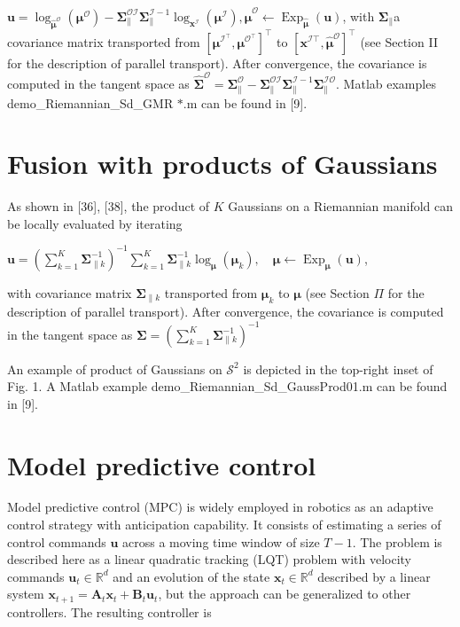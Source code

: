 \documentclass[10pt]{article}
\begin{document}
$\boldsymbol{u}=\log _{\hat{\boldsymbol{\mu}}^{\mathcal{O}}}\left(\boldsymbol{\mu}^{\mathcal{O}}\right)-\boldsymbol{\Sigma}_{\|}^{\mathcal{O I}} \boldsymbol{\Sigma}_{\|}^{\mathcal{I}-1} \log _{\boldsymbol{x}^{\mathcal{I}}}\left(\boldsymbol{\mu}^{\mathcal{I}}\right), \hat{\boldsymbol{\mu}}^{\mathcal{O}} \leftarrow \operatorname{Exp}_{\hat{\boldsymbol{\mu}}}(\boldsymbol{u})$, with $\boldsymbol{\Sigma}_{\|}$a covariance matrix transported from $\left[\boldsymbol{\mu}^{\mathcal{I}^{\top}}, \boldsymbol{\mu}^{\mathcal{O}^{\top}}\right]^{\top}$ to $\left[\boldsymbol{x}^{\mathcal{I} \top}, \hat{\boldsymbol{\mu}}^{\mathcal{O}}\right]^{\top}$ (see Section II for the description of parallel transport). After convergence, the covariance is computed in the tangent space as $\hat{\boldsymbol{\Sigma}}^{\mathcal{O}}=\boldsymbol{\Sigma}_{\|}^{\mathcal{O}}-\boldsymbol{\Sigma}_{\|}^{\mathcal{O I}} \boldsymbol{\Sigma}_{\|}^{\mathcal{I}-1} \boldsymbol{\Sigma}_{\|}^{\mathcal{I O}}$. Matlab examples demo\_Riemannian\_Sd\_GMR $* . \mathrm{m}$ can be found in [9].

\section{Fusion with products of Gaussians}
As shown in [36], [38], the product of $K$ Gaussians on a Riemannian manifold can be locally evaluated by iterating

$\boldsymbol{u}=\left(\sum_{k=1}^{K} \boldsymbol{\Sigma}_{\| k}^{-1}\right)^{-1} \sum_{k=1}^{K} \boldsymbol{\Sigma}_{\| k}^{-1} \log _{\boldsymbol{\mu}}\left(\boldsymbol{\mu}_{k}\right), \quad \boldsymbol{\mu} \leftarrow \operatorname{Exp}_{\boldsymbol{\mu}}(\boldsymbol{u})$,

with covariance matrix $\boldsymbol{\Sigma}_{\| k}$ transported from $\boldsymbol{\mu}_{k}$ to $\boldsymbol{\mu}$ (see Section $\Pi$ for the description of parallel transport). After convergence, the covariance is computed in the tangent space as $\boldsymbol{\Sigma}=\left(\sum_{k=1}^{K} \boldsymbol{\Sigma}_{\| k}^{-1}\right)^{-1}$

An example of product of Gaussians on $\mathcal{S}^{2}$ is depicted in the top-right inset of Fig. 1. A Matlab example demo\_Riemannian\_Sd\_GaussProd01.m can be found in [9].

\section{Model predictive control}
Model predictive control (MPC) is widely employed in robotics as an adaptive control strategy with anticipation capability. It consists of estimating a series of control commands $\boldsymbol{u}$ across a moving time window of size $T-1$. The problem is described here as a linear quadratic tracking (LQT) problem with velocity commands $\boldsymbol{u}_{t} \in \mathbb{R}^{d}$ and an evolution of the state $\boldsymbol{x}_{t} \in \mathbb{R}^{d}$ described by a linear system $\boldsymbol{x}_{t+1}=\boldsymbol{A}_{t} \boldsymbol{x}_{t}+\boldsymbol{B}_{t} \boldsymbol{u}_{t}$, but the approach can be generalized to other controllers. The resulting controller is
\end{document}
